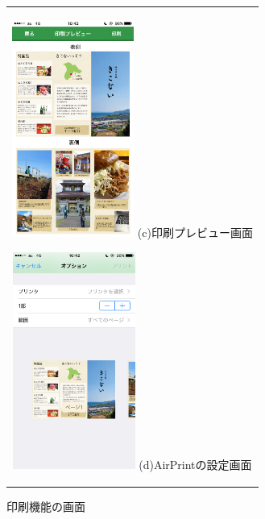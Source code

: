 \begin{figure}[htbp]
\begin{center}
\begin{tabular}{c}
      \\
      
      \begin{minipage}{0.33\hsize}
        \begin{center}
\includegraphics[width=4cm, bb=0 0 304 570]{kiko_print4.PNG}
          \hspace{1cm} %
          {\footnotesize (c)印刷プレビュー画面}
        \end{center}
      \end{minipage}

      \begin{minipage}{0.33\hsize}
        \begin{center}
\includegraphics[width=4cm, bb=0 0 304 570]{kiko_print5.PNG}
          \hspace{1cm} %
          {\footnotesize (d)AirPrintの設定画面}
        \end{center}
      \end{minipage}
      

    \end{tabular}
    \caption{印刷機能の画面}
    \label{fig:lena}
  \end{center}
\end{figure}　　　　　　　

\newpage
